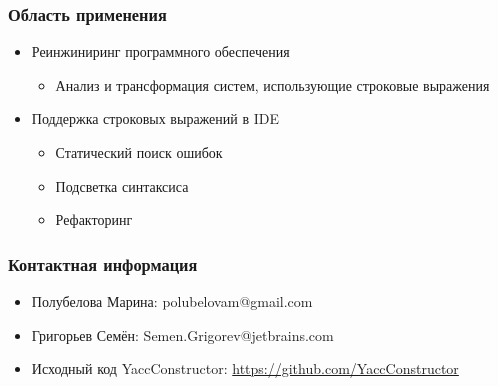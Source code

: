 \documentclass{beamer}
\begin{document}
\begin{frame}
\transwipe[direction=90]
\frametitle{Область применения}
\begin{itemize}
\item Реинжиниринг программного обеспечения
    \begin{itemize}
    \item Анализ и трансформация систем, использующие строковые выражения
    \end{itemize}
\item Поддержка строковых выражений в IDE
    \begin{itemize}
    \item Статический поиск ошибок
    \item Подсветка синтаксиса
    \item Рефакторинг
    \end{itemize}
\end{itemize}
\end{frame}

\begin{frame}
\transwipe[direction=90]
\frametitle{Контактная информация}
\begin{itemize}
\item Полубелова Марина: polubelovam@gmail.com
\item Григорьев Семён: Semen.Grigorev@jetbrains.com
\item Исходный код YaccConstructor:
\href{https://github.com/YaccConstructor}{https://github.com/YaccConstructor}
\end{itemize}
\end{frame}
\end{document}
